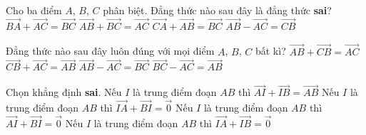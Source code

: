 \begin{ex}%
	Cho ba điểm $A$, $B$, $C$ phân biệt.  Đẳng thức nào sau đây là đẳng thức \textbf{sai}?
	\choice 
		 {$\overrightarrow{BA}+\overrightarrow{AC}=\overrightarrow{BC}$}
		{$\overrightarrow{AB}+\overrightarrow{BC}=\overrightarrow{AC}$} 
		{\True $\overrightarrow{CA}+\overrightarrow{AB}=\overrightarrow{BC}$} 
		{$\overrightarrow{AB}-\overrightarrow{AC}=\overrightarrow{CB}$} 
\end{ex}

\begin{ex}%
	Đẳng thức nào sau đây  luôn đúng với mọi điểm $A$, $B$, $C$ bất kì?
	\choice 
		{$\overrightarrow{AB}+\overrightarrow{CB}=\overrightarrow{AC}$} 
		 {\True $\overrightarrow{CB}+\overrightarrow{AC}=\overrightarrow{AB}$}
		{$\overrightarrow{AB}-\overrightarrow{AC}=\overrightarrow{BC}$} 
		 {$\overrightarrow{BC}-\overrightarrow{AC}=\overrightarrow{AB}$}
\end{ex}

\begin{ex}%
	Chọn khẳng định  \textbf{sai}.
	\choice 
		 {Nếu $I$ là trung điểm đoạn $AB$ thì $\overrightarrow{AI}+\overrightarrow{IB}=\overrightarrow{AB}$}
		{\True Nếu $I$ là trung điểm đoạn $AB$  thì $\overrightarrow{IA}+\overrightarrow{BI}=\overrightarrow{0}$}
		{Nếu  $I$ là trung điểm đoạn $AB$ thì $\overrightarrow{AI}+\overrightarrow{BI}=\overrightarrow{0}$}
		{Nếu $I$ là trung  điểm đoạn $AB$ thì $\overrightarrow{IA}+\overrightarrow{IB}=\overrightarrow{0}$}
\end{ex}

